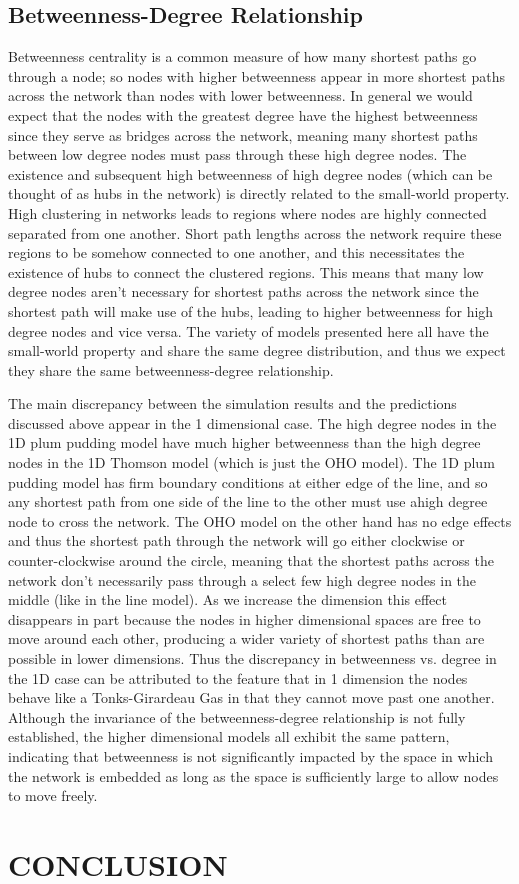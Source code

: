 \documentclass[aps,pre,reprint,superscriptaddress,amsmath,amssymb]{revtex4-1}
\begin{document}
\subsection{Betweenness-Degree Relationship}	%
Betweenness centrality is a common measure of how many shortest paths go through a node; so nodes with higher betweenness appear in more shortest paths across the network than nodes with lower betweenness.
In general we would expect that the nodes with the greatest degree have the highest betweenness since they serve as bridges across the network, meaning many shortest paths between low degree nodes must pass through these high degree nodes.
The existence and subsequent high betweenness of high degree nodes (which can be thought of as hubs in the network) is directly related to the small-world property.
High clustering in networks leads to regions where nodes are highly connected separated from one another.
Short path lengths across the network require these regions to be somehow connected to one another, and this necessitates the existence of hubs to connect the clustered regions.
This means that many low degree nodes aren't necessary for shortest paths across the network since the shortest path will make use of the hubs, leading to higher betweenness for high degree nodes and vice versa.
The variety of models presented here all have the small-world property and share the same degree distribution, and thus we expect they share the same betweenness-degree relationship.


The main discrepancy between the simulation results and the predictions discussed above appear in the 1 dimensional case.
The high degree nodes in the 1D plum pudding model have much higher betweenness than the high degree nodes in the 1D Thomson model (which is just the OHO model).
The 1D plum pudding model has firm boundary conditions at either edge of the line, and so any shortest path from one side of the line to the other must use ahigh degree node to cross the network.
The OHO model on the other hand has no edge effects and thus the shortest path through the network will go either clockwise or counter-clockwise around the circle, meaning that the shortest paths across the network don't necessarily pass through a select few high degree nodes in the middle (like in the line model).
As we increase the dimension this effect disappears in part because the nodes in higher dimensional spaces are free to move around each other, producing a wider variety of shortest paths than are possible in lower dimensions. 
Thus the discrepancy in betweenness vs. degree in the 1D case can be attributed to the feature that in 1 dimension the nodes behave like a Tonks-Girardeau Gas in that they cannot move past one another.
Although the invariance of the betweenness-degree relationship is not fully established, the higher dimensional models all exhibit the same pattern, indicating that betweenness is not significantly impacted by the space in which the network is embedded as long as the space is sufficiently large to allow nodes to move freely.

\section{CONCLUSION}


\end{document}

